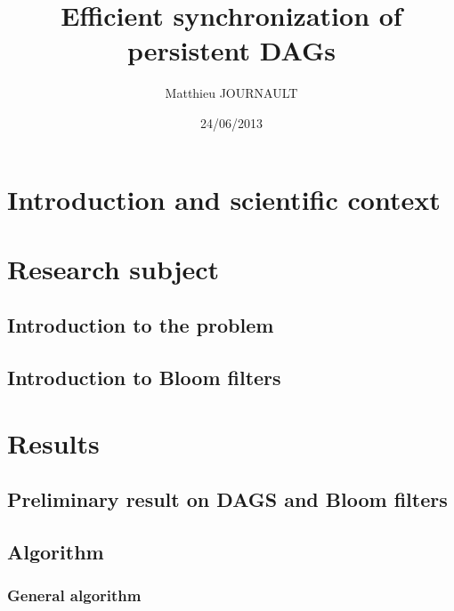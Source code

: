 \documentclass[a4paper,10pt]{report}
\title{Efficient synchronization of persistent DAGs}
\author{Matthieu JOURNAULT}
\date{24/06/2013}
\theoremstyle{definition}
\theoremstyle{definition}
\begin{document}
% 
\maketitle
\tableofcontents
% 
\chapter{Introduction and scientific context}

\chapter{Research subject}
\section{Introduction to the problem}

\section{Introduction to Bloom filters}

\chapter{Results}
\section{Preliminary result on DAGS and Bloom filters}
\label{sec:prelim}

\section{Algorithm}
\subsection{General algorithm}

\end{document}
